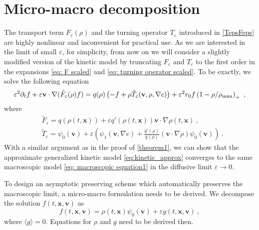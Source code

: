 \documentclass[review,onefignum,onetabnum]{siamart220329}
\newcommand {\e}  {\varepsilon}
\newcommand {\bv} { {\mathbf{v}} }
\newcommand {\bx} { {\mathbf{x}} }
\newcommand {\p}   {\partial}
\newcommand{\beq}{\begin{equation}}
\newcommand{\eeq}{\end{equation}}
\newcommand{\XR} {\color{red}}
\begin{document}
\section{Micro-macro decomposition}\label{sec:micro-macro}
{\XR 
The transport term $F_\varepsilon(\rho)$ and the turning operator $T_\varepsilon$ introduced in \cref{TepsFeps} are highly nonlinear and inconvenient for practical use.
As we are interested in the limit of small $\varepsilon$, for simplicity, from now on we will consider a slightly modified version of the kinetic model by truncating $F_\varepsilon$ and $T_\varepsilon$ to the first order in the expansions \cref{eq: F scaled} and \cref{eq: turning operator scaled}.
To be exactly, we solve the following equation }
\beq
\label{eq:kinetic_approx}
	\e^2 \p_t f + \e \bv \cdot \nabla(\tilde{F}_\varepsilon(\rho)f) = q(\rho) \left(-f + \rho \tilde{T}_\varepsilon(\bv, \rho, \nabla c)\right) + \e^2 r_0f\left(1-\rho/\rho_{\textnormal{max}}\right)_+\ ,
\eeq
where
\begin{align*}
    &\tilde{F}_\varepsilon = q(\rho(t,\bx)) + \varepsilon q'(\rho(t,\bx))\bv\cdot\nabla\rho(t,\bx)\ ,\\
    &\tilde{T}_\varepsilon = \psi_0(\bv) + \varepsilon\left(\psi_1(\bv,\nabla c) + \frac{q'(\rho)}{q(\rho)}(\bv\cdot\nabla\rho)\psi_0(\bv)\right)\ .
\end{align*}
With a similar argument as in the proof of \cref{theorem1}, we can show that the approximate generalized kinetic model \cref{eq:kinetic_approx} converges to the same macroscopic model \cref{eq: macroscopic equation1} in the diffusive limit $\varepsilon\to 0$.

To design an asymptotic preserving scheme which automatically preserves the macroscopic limit, a micro-macro formulation needs to be derived. 
We decompose the solution $f(t,\bx,\bv)$ as 
\begin{equation}\label{def:f_decompose}
    f(t,\bx,\bv) = \rho(t,\bx) \psi_0(\bv) + \varepsilon g(t,\bx,\bv)\ ,
\end{equation}
where $\langle g\rangle = 0$. 
Equations for $\rho$ and $g$ need to be derived then. 
\end{document}
